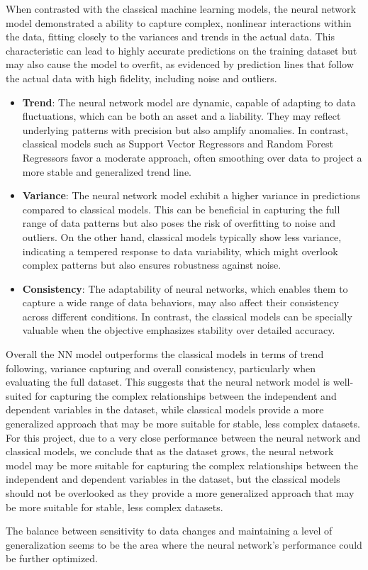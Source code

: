 When contrasted with the classical machine learning models, the neural network model demonstrated a ability to capture complex, nonlinear interactions within the data, fitting closely to the 
variances and trends in the actual data. This characteristic can lead to highly accurate predictions on the training dataset but may also cause the model to overfit, as evidenced by prediction 
lines that follow the actual data with high fidelity, including noise and outliers.

\begin{itemize}
    \item \textbf{Trend}: The neural network model are dynamic, capable of adapting to data fluctuations, which can be both an asset and a liability. They may reflect underlying patterns with precision but also amplify 
    anomalies. In contrast, classical models such as Support Vector Regressors and Random Forest Regressors favor a moderate approach, often smoothing over data to project a more stable and generalized trend line.
    
    \item \textbf{Variance}: The neural network model exhibit a higher variance in predictions compared to classical models. This can be beneficial in capturing the full range of data patterns but 
    also poses the risk of overfitting to noise and outliers. On the other hand, classical models typically show less variance, indicating a tempered response to data variability, which might overlook 
    complex patterns but also ensures robustness against noise.

    \item \textbf{Consistency}: The adaptability of neural networks, which enables them to capture a wide range of data behaviors, may also affect their consistency across different conditions.
    In contrast, the classical models can be specially valuable when the objective emphasizes stability over detailed accuracy.
    

\end{itemize}


Overall the NN model outperforms the classical models in terms of trend following, variance capturing and overall consistency, particularly when evaluating the full dataset. This suggests that 
the neural network model is well-suited for capturing the complex relationships between the independent and dependent variables in the dataset, while classical models provide a more generalized
approach that may be more suitable for stable, less complex datasets.
For this project, due to a very close performance between the neural network and classical models, we conclude that as the dataset grows, the neural network model may be more suitable for capturing
the complex relationships between the independent and dependent variables in the dataset, but the classical models should not be overlooked as they provide a more generalized approach that may
be more suitable for stable, less complex datasets.

The balance between sensitivity to data changes and maintaining a level of generalization seems to be the area where the neural network's performance could be further optimized.